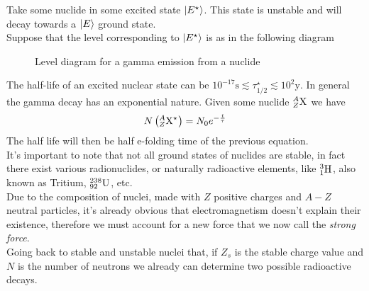 \documentclass[../qm.tex]{subfiles}
\begin{document}
Take some nuclide in some excited state $\ket{E^\star}$. This state is unstable and will decay towards a $\ket{E}$ ground state.\\
Suppose that the level corresponding to $\ket{E^\star}$ is as in the following diagram
\begin{figure}[H]
	\centering
	\caption{Level diagram for a gamma emission from a nuclide}
	\label{fig:gammaelevel}
\end{figure}
The half-life of an excited nuclear state can be $10^{-17}\mathrm{ s}\lesssim\tau_{1/2}^\star\lesssim10^2\mathrm{ y}$. In general the gamma decay has an exponential nature. Given some nuclide $\nuc{X}{A}{Z}$ we have
\begin{equation*}
	N\left( \nuc{X^\star}{A}{Z} \right)=N_0e^{-\frac{t}{\tau}}
\end{equation*}
The half life will then be half e-folding time of the previous equation.\\
It's important to note that not all ground states of nuclides are stable, in fact there exist various radionuclides, or naturally radioactive elements, like $\nuc{H}{3}{1}$, also known as Tritium, $\nuc{U}{238}{92}$, etc.\\
Due to the composition of nuclei, made with $Z$ positive charges and $A-Z$ neutral particles, it's already obvious that electromagnetism doesn't explain their existence, therefore we must account for a new force that we now call the \emph{strong force}.\\
Going back to stable and unstable nuclei that, if $Z_s$ is the stable charge value and $N$ is the number of neutrons we already can determine two possible radioactive decays.
\end{document}
